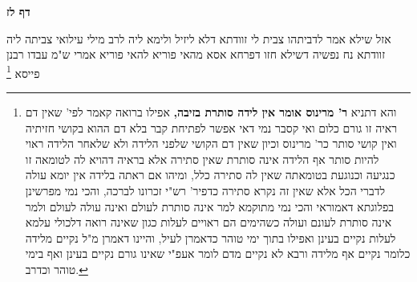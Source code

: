 \documentclass[12pt, openany]{book}
\newcommand{\sethebfont}{
\fontsize{10.5pt}{21.0pt} \selectfont
}
\newcommand{\twocol}[1]{
	{\sethebfont \begin{multicols}{2}
			#1
	\end{multicols}}	
}
\newcommand{\sectname}{}
\newcommand{\newsection}[1]{
	\addcontentsline{toc}{section}{#1}
	\renewcommand{\sectname}{#1}	
	\vspace{-\baselineskip}
	\begin{center}
		\textbf{%
\fontsize{16pt}{16pt}\selectfont
			#1}
	\end{center}
	\vspace{-\baselineskip}
	\nopagebreak
}
\newcommand{\footnotecomment}[1]{\footnote{#1}}
\newcommand{\commenta}[1]{\footnotecomment{#1}}
\begin{document}
\newsection{דף לז}
\twocol{אזל שילא אמר לדביתהו  צבית לי זוודתא דלא ליזיל ולימא ליה לרב מילי עילואי  צביתה ליה זוודתא נח נפשיה דשילא  חזו דפרחא אסא מהאי פוריא להאי פוריא אמרי  ש"מ עבדו רבנן פייסא 
\commenta{והא דתניא \textbf{ר' מרינוס אומר אין לידה סותרת בזיבה,}  אפילו ברואה קאמר לפי' שאין דם ראיה זו גורם כלום ואי קסבר נמי דאי אפשר לפתיחת קבר בלא דם ההוא בקושי חזיתיה ואין קושי סותר כר' מרינוס וכיון שאין דם הקושי שלפני הלידה ולא שלאחר הלידה ראוי להיות סותר אף הלידה אינה סותרת שאין סתירה אלא בראיה דהויא לה לטומאה זו כנגיעה וכנוגעת בטומאתה שאין לה סתירה כלל, ומיהו אם ראתה בלידה אין יומא עולה לדברי הכל אלא שאין זה נקרא סתירה כדפיר' רש"י זכרונו לברכה, והכי נמי מפרשינן בפלוגתא דאמוראי והכי נמי מתוקמא למר אינה סותרת לעולם ואינה עולה לעולם ולמר אינה סותרת לעונם ועולה כשהימים הם ראויים לעלות כגון שאינה רואה דלכולי עלמא לעלות נקיים בעינן ואפילו בתוך ימי טוהר כדאמרן לעיל, והיינו דאמרן מ"ל נקיים מלידה כלומר נקיים אף מלידה ורבא לא נקיים מדם לומר אעפ"י שאינו גורם נקיים בעינן ואף בימי טוהר וכדרב. }

}
\end{document}
